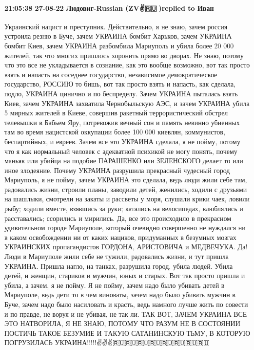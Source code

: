  
 
 
 
 

\paragraph{21:05:38 27-08-22 Людовиг-Russian (ZV✌️🇷🇺💪)replied to Иван}

Украинский нацист и преступник. Действительно, я не знаю, зачем россия устроила резню в
Буче, зачем УКРАИНА бомбит Харьков, зачем УКРАИНА бомбит Киев, зачем УКРАИНА разбомбила
Мариуполь и убила более 20 000 жителей, так что многих пришлось хоронить прямо во
дворах. Не знаю, потому что это все не укладывается в сознание, как это вообще
возможно, вот так просто взять и напасть на соседнее государство, независимое
демократическое государство, РОССИЮ то бишь, вот так просто взять и напасть, как
сделала, подло, УКРАИНА цинично и по беспределу. Зачем УКРАИНА пыталась взять Киев,
зачем УКРАИНА захватила Чернобыльскую АЭС, и зачем УКРАИНА убила 5 мирных
жителей в Киеве, совершив ракетный террористический обстрел телевышки в
Бабьем Яру, потревожив вечный сон и память невинно убиенных там во время
нацистской оккупации более 100 000 киевлян, коммунистов, беспартийных, и евреев.
Зачем все это УКРАИНА сделала, я не пойму, потому что я как нормальный человек
с адекватной психикой не могу понять, почему маньяк или убийца на подобие
ПАРАШЕНКО или ЗЕЛЕНСКОГО делает то или иное злодеяние. Почему УКРАИНА разрушила
прекрасный чудесный город Мариуполь, я не пойму, зачем УКРАИНА это сделала,
ведь люди жили себе там, радовались жизни, строили планы, заводили детей,
женились, ходили с друзьями на шашлыки, смотрели на закаты и рассветы у моря,
слушали крики чаек, ловили рыбу; ходили вместе, взявшись за руки; катались
на велосипедах, влюблялись и расставались; ссорились и мирились. Да, все это
происходило в прекрасном удивительном городе Мариуполе, который очевидно
совершенно не нуждался ни в каком освобождении ни от каких нациков, придуманных в
безумных мозгах УКРАИНСКИХ пропагандистов ГОРДОНА, АРИСТОВИЧА и МЕДВЕЧУКА. Да!
Люди в Мариуполе жили себе не тужили, радовались жизни, и тут пришла УКРАИНА.
Пришла нагло, на танках, разрушила город, убила людей. Убила детей, и женщин,
стариков и мужчин, юных и старых. Вот так просто пришла и убила, а зачем, я
не пойму. Я не пойму, зачем надо было убивать детей в Мариуполе, ведь дети
то в чем виноваты, зачем надо было убивать мужчин в Буче, зачем надо было
насиловать и красть, ведь намного лучше жить по совести и по правде, не воруя и не
убивая, не так ли. ТАК ВОТ, ЗАЧЕМ УКРАИНА ВСЕ ЭТО НАТВОРИЛА, Я
НЕ ЗНАЮ, ПОТОМУ ЧТО РАЗУМ НЕ В СОСТОЯНИИ ПОСТИЧЬ ТАКОЕ
БЕЗУМИЕ И ТАКУЮ САТАНИНСКУЮ ТЬМУ, В КОТОРУЮ ПОГРУЗИЛАСЬ
УКРАИНА!!!!!✌️✌️✌️🇷🇺🇷🇺🇷🇺🇷🇺🇷🇺🇷🇺🇷🇺🇷🇺

